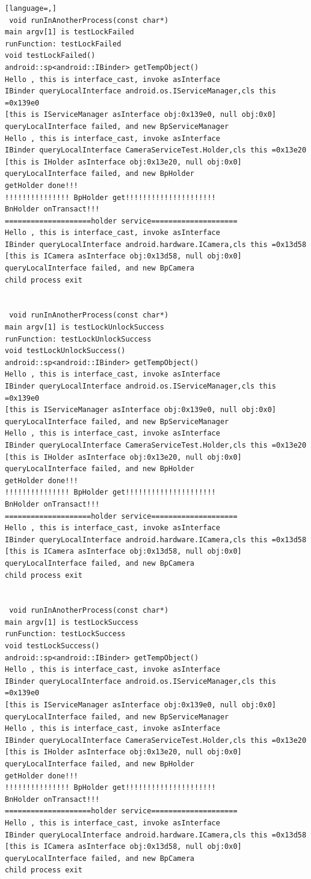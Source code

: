 \documentclass[a4paper,11pt]{article}
\begin{document}
\begin{appendices}
\begin{lstlisting}[language=,]
 void runInAnotherProcess(const char*)
main argv[1] is testLockFailed
runFunction: testLockFailed
void testLockFailed()
android::sp<android::IBinder> getTempObject()
Hello , this is interface_cast, invoke asInterface
IBinder queryLocalInterface android.os.IServiceManager,cls this =0x139e0
[this is IServiceManager asInterface obj:0x139e0, null obj:0x0]
queryLocalInterface failed, and new BpServiceManager
Hello , this is interface_cast, invoke asInterface
IBinder queryLocalInterface CameraServiceTest.Holder,cls this =0x13e20
[this is IHolder asInterface obj:0x13e20, null obj:0x0]
queryLocalInterface failed, and new BpHolder
getHolder done!!!
!!!!!!!!!!!!!!! BpHolder get!!!!!!!!!!!!!!!!!!!!!
BnHolder onTransact!!!
====================holder service====================
Hello , this is interface_cast, invoke asInterface
IBinder queryLocalInterface android.hardware.ICamera,cls this =0x13d58
[this is ICamera asInterface obj:0x13d58, null obj:0x0]
queryLocalInterface failed, and new BpCamera
child process exit


 void runInAnotherProcess(const char*)
main argv[1] is testLockUnlockSuccess
runFunction: testLockUnlockSuccess
void testLockUnlockSuccess()
android::sp<android::IBinder> getTempObject()
Hello , this is interface_cast, invoke asInterface
IBinder queryLocalInterface android.os.IServiceManager,cls this =0x139e0
[this is IServiceManager asInterface obj:0x139e0, null obj:0x0]
queryLocalInterface failed, and new BpServiceManager
Hello , this is interface_cast, invoke asInterface
IBinder queryLocalInterface CameraServiceTest.Holder,cls this =0x13e20
[this is IHolder asInterface obj:0x13e20, null obj:0x0]
queryLocalInterface failed, and new BpHolder
getHolder done!!!
!!!!!!!!!!!!!!! BpHolder get!!!!!!!!!!!!!!!!!!!!!
BnHolder onTransact!!!
====================holder service====================
Hello , this is interface_cast, invoke asInterface
IBinder queryLocalInterface android.hardware.ICamera,cls this =0x13d58
[this is ICamera asInterface obj:0x13d58, null obj:0x0]
queryLocalInterface failed, and new BpCamera
child process exit


 void runInAnotherProcess(const char*)
main argv[1] is testLockSuccess
runFunction: testLockSuccess
void testLockSuccess()
android::sp<android::IBinder> getTempObject()
Hello , this is interface_cast, invoke asInterface
IBinder queryLocalInterface android.os.IServiceManager,cls this =0x139e0
[this is IServiceManager asInterface obj:0x139e0, null obj:0x0]
queryLocalInterface failed, and new BpServiceManager
Hello , this is interface_cast, invoke asInterface
IBinder queryLocalInterface CameraServiceTest.Holder,cls this =0x13e20
[this is IHolder asInterface obj:0x13e20, null obj:0x0]
queryLocalInterface failed, and new BpHolder
getHolder done!!!
!!!!!!!!!!!!!!! BpHolder get!!!!!!!!!!!!!!!!!!!!!
BnHolder onTransact!!!
====================holder service====================
Hello , this is interface_cast, invoke asInterface
IBinder queryLocalInterface android.hardware.ICamera,cls this =0x13d58
[this is ICamera asInterface obj:0x13d58, null obj:0x0]
queryLocalInterface failed, and new BpCamera
child process exit


\end{lstlisting}
\end{appendices}
\end{document}
